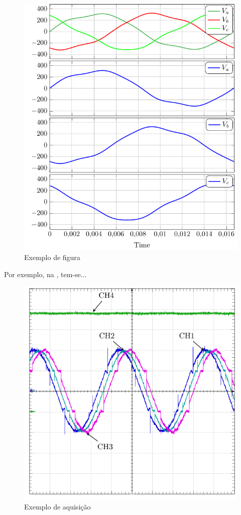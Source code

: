 \begin{figure}
    \caption{Exemplo de figura}
    \label{fig:ex01}
    \centering
    \includegraphics[width=\linewidth]{pictures/ex01}
\end{figure}


Por exemplo, na , tem-se...

\begin{figure}
    \caption{Exemplo de aquisição}
    \label{fig:tek0009}
    \centering
    \includegraphics[width=0.9\linewidth]{pictures/tek0009}
\end{figure}


